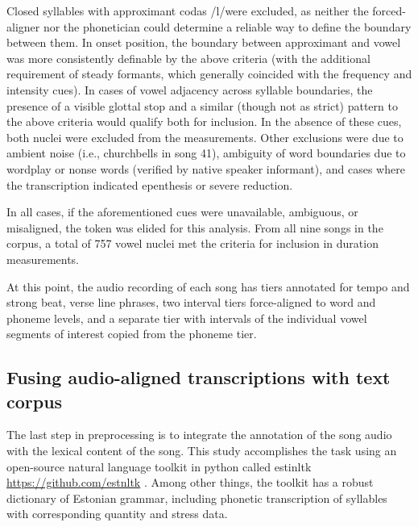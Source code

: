 Closed syllables with approximant codas /l/were excluded, as neither the forced-aligner nor the phonetician could determine a reliable way to define the boundary between them. In onset position, the boundary between approximant and vowel was more consistently definable by the above criteria (with the additional requirement of steady formants, which generally coincided with the frequency and intensity cues). In cases of vowel adjacency across syllable boundaries, the presence of a visible glottal stop and a similar (though not as strict) pattern to the above criteria would qualify both for inclusion. In the absence of these cues, both nuclei were excluded from the measurements. Other exclusions were due to ambient noise (i.e., churchbells in song 41), ambiguity of word boundaries due to wordplay or nonse words (verified by native speaker informant), and cases where the transcription indicated epenthesis or severe reduction. 


In all cases, if the aforementioned cues were unavailable, ambiguous, or misaligned, the token was elided for this analysis. From all nine songs in the corpus, a total of 757 vowel nuclei met the criteria for inclusion in duration measurements. 


At this point, the audio recording of each song has tiers annotated for tempo and strong beat, verse line phrases, two interval tiers force-aligned to word and phoneme levels, and a separate tier with intervals of the individual vowel segments of interest copied from the phoneme tier.
\subsection{Fusing audio-aligned transcriptions with text corpus}

The last step in preprocessing is to integrate the annotation of the song audio with the lexical content of the song. This study accomplishes the task using an open-source natural language toolkit in python called estinltk \url{https://github.com/estnltk} \citep{estnltk2020}. Among other things, the toolkit has a robust dictionary of Estonian grammar, including phonetic transcription of syllables with corresponding quantity and stress data. 


